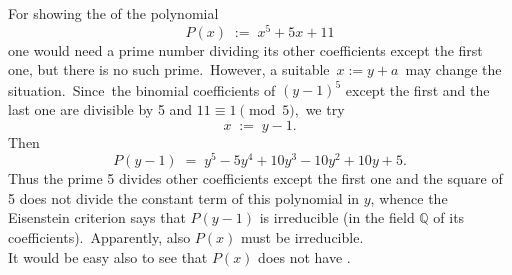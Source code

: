 \documentclass[12pt]{article}
\theoremstyle{definition}
\begin{document}
For showing the  of the polynomial
$$P(x) \;:=\; x^5\!+\!5x\!+\!11$$
one would need a prime number dividing its other coefficients except the first one, but there is no such prime.\, However, a suitable  \,$x := y\!+\!a$\, may change the situation.\, Since\, the binomial coefficients of 
$(y\!-\!1)^5$ except the first and the last one are divisible by 5 and $11 \equiv 1 \pmod{5}$,\, we try
$$x \;:=\; y-1.$$
Then
$$P(y\!-\!1) \;=\; y^5\!-\!5y^4\!+\!10y^3\!-\!10y^2\!+\!10y\!+\!5.$$
Thus the prime 5 divides other coefficients except the first one and the square of 5 does not divide the constant term of this polynomial in $y$, whence the Eisenstein criterion says that $P(y\!-\!1)$ is irreducible (in the field $\mathbb{Q}$ of its coefficients).\, Apparently, also $P(x)$ must be irreducible.\\

It would be easy also to see that $P(x)$ does not have .
\end{document}
